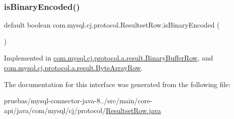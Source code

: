\subsubsection{\texorpdfstring{is\+Binary\+Encoded()}{isBinaryEncoded()}}
{\footnotesize\ttfamily default boolean com.\+mysql.\+cj.\+protocol.\+Resultset\+Row.\+is\+Binary\+Encoded (\begin{DoxyParamCaption}{ }\end{DoxyParamCaption})}



Implemented in \mbox{\hyperlink{classcom_1_1mysql_1_1cj_1_1protocol_1_1a_1_1result_1_1_binary_buffer_row_a699d5aa259fbe51d4478babc94d39090}{com.\+mysql.\+cj.\+protocol.\+a.\+result.\+Binary\+Buffer\+Row}}, and \mbox{\hyperlink{classcom_1_1mysql_1_1cj_1_1protocol_1_1a_1_1result_1_1_byte_array_row_a30e76b0cb27fb8a86ea186066605e756}{com.\+mysql.\+cj.\+protocol.\+a.\+result.\+Byte\+Array\+Row}}.



The documentation for this interface was generated from the following file\+:\begin{DoxyCompactItemize}
\item 
pruebas/mysql-\/connector-\/java-\/8../src/main/core-\/api/java/com/mysql/cj/protocol/\mbox{\hyperlink{_resultset_row_8java}{Resultset\+Row.\+java}}\end{DoxyCompactItemize}
